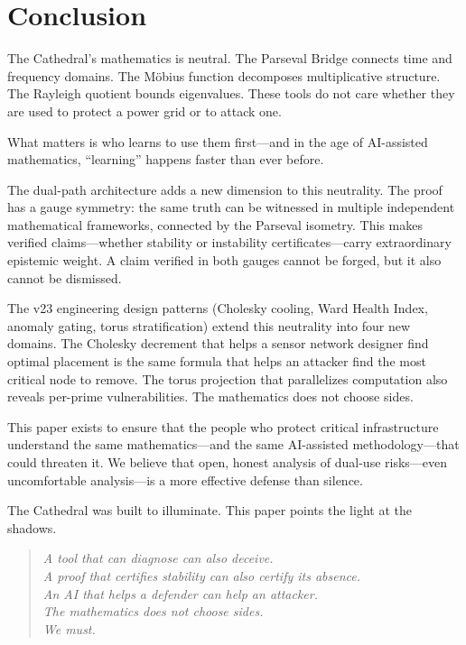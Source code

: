 \documentclass[11pt,a4paper]{article}
\begin{document}
\section{Conclusion}

The Cathedral's mathematics is neutral. The Parseval Bridge connects
time and frequency domains. The M\"obius function decomposes
multiplicative structure. The Rayleigh quotient bounds eigenvalues.
These tools do not care whether they are used to protect a power
grid or to attack one.

What matters is who learns to use them first---and in the age of
AI-assisted mathematics, ``learning'' happens faster than ever before.

The dual-path architecture adds a new dimension to this neutrality.
The proof has a gauge symmetry: the same truth can be witnessed in
multiple independent mathematical frameworks, connected by the Parseval
isometry. This makes verified claims---whether stability or
instability certificates---carry extraordinary epistemic weight.
A claim verified in both gauges cannot be forged, but it also
cannot be dismissed.

The v23 engineering design patterns (Cholesky cooling, Ward Health
Index, anomaly gating, torus stratification) extend this neutrality
into four new domains. The Cholesky decrement that helps a sensor
network designer find optimal placement is the same formula that
helps an attacker find the most critical node to remove. The torus
projection that parallelizes computation also reveals per-prime
vulnerabilities. The mathematics does not choose sides.

This paper exists to ensure that the people who protect critical
infrastructure understand the same mathematics---and the same
AI-assisted methodology---that could threaten it. We believe that
open, honest analysis of dual-use risks---even uncomfortable
analysis---is a more effective defense than silence.

The Cathedral was built to illuminate. This paper points the light
at the shadows.

\begin{quote}
\emph{A tool that can diagnose can also deceive.\\
A proof that certifies stability can also certify its absence.\\
An AI that helps a defender can help an attacker.\\
The mathematics does not choose sides.\\
We must.}
\end{quote}
\end{document}
